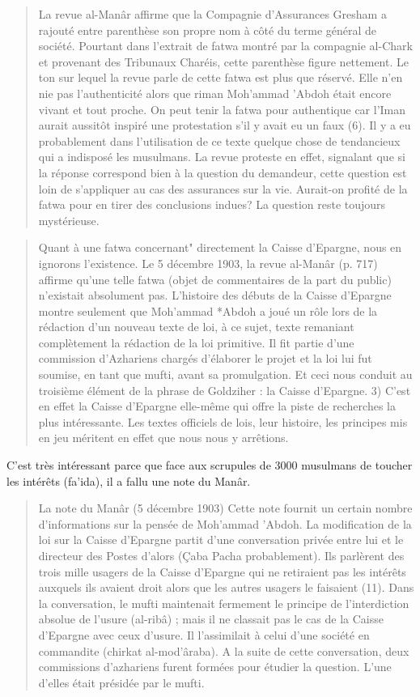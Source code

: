 \begin{quote}
    La revue al-Manâr affirme que la Compagnie d'Assurances Gresham a rajouté
entre parenthèse son propre nom à côté du terme général de société. Pourtant
dans l'extrait de fatwa montré par la compagnie al-Chark et provenant des
Tribunaux Charéis, cette parenthèse figure nettement. Le ton sur lequel la revue
parle de cette fatwa est plus que réservé. Elle n'en nie pas l'authenticité alors que
riman Moh'ammad 'Abdoh était encore vivant et tout proche. On peut tenir la
fatwa pour authentique car l'Iman aurait aussitôt inspiré une protestation s'il y
avait eu un faux (6). Il y a eu probablement dans l'utilisation de ce texte quelque
chose de tendancieux qui a indisposé les musulmans. La revue proteste en effet,
signalant que si la réponse correspond bien à la question du demandeur, cette
question est loin de s'appliquer au cas des assurances sur la vie. Aurait-on profité
de la fatwa pour en tirer des conclusions indues? La question reste toujours
mystérieuse.
\end{quote}

\begin{quote}
    Quant à une fatwa concernant" directement la Caisse d'Epargne, nous en
ignorons l'existence. Le 5 décembre 1903, la revue al-Manâr (p. 717) affirme
qu'une telle fatwa (objet de commentaires de la part du public) n'existait
absolument pas. L'histoire des débuts de la Caisse d'Epargne montre seulement
que Moh'ammad *Abdoh a joué un rôle lors de la rédaction d'un nouveau texte de
loi, à ce sujet, texte remaniant complètement la rédaction de la loi primitive. Il fit
partie d'une commission d'Azhariens chargés d'élaborer le projet et la loi lui fut
soumise, en tant que mufti, avant sa promulgation. Et ceci nous conduit au
troisième élément de la phrase de Goldziher : la Caisse d'Epargne.
3) C'est en effet la Caisse d'Epargne elle-même qui offre la piste de
recherches la plus intéressante. Les textes officiels de lois, leur histoire, les
principes mis en jeu méritent en effet que nous nous y arrêtions.
\end{quote}

C'est très intéressant parce que face aux scrupules de 3000 musulmans de toucher les intérêts (fa'ida), il a fallu une note du Manâr.
\begin{quote}
    La note du Manâr (5 décembre 1903)
Cette note fournit un certain nombre d'informations sur la pensée de
Moh'ammad 'Abdoh. La modification de la loi sur la Caisse d'Epargne partit d'une conversation privée entre lui et le directeur des Postes d'alors (Çaba Pacha
probablement). Ils parlèrent des trois mille usagers de la Caisse d'Epargne qui ne
retiraient pas les intérêts auxquels ils avaient droit alors que les autres usagers le
faisaient (11). Dans la conversation, le mufti maintenait fermement le principe de
l'interdiction absolue de l'usure (al-ribâ) ; mais il ne classait pas le cas de la Caisse
d'Epargne avec ceux d'usure. Il l'assimilait à celui d'une société en commandite
(chirkat al-mod'âraba).
A la suite de cette conversation, deux commissions d'azhariens furent
formées pour étudier la question. L'une d'elles était présidée par le mufti.
\end{quote}

